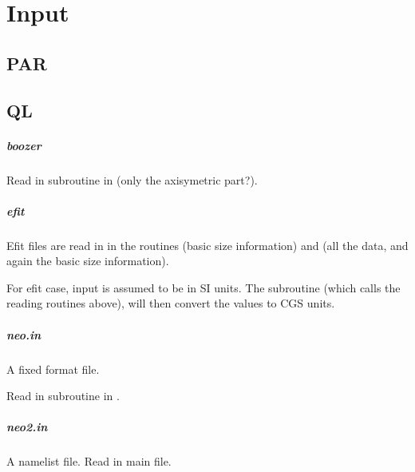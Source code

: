 \chapter{Input\label{ch:input}}


\section{PAR}


\section{QL}

\paragraph{boozer}
Read in subroutine  in  (only
the axisymetric part?).

\paragraph{efit}
Efit files are read in  in the routines
 (basic size information) and
 (all the data, and again the basic size
information).

For efit case, input is assumed to be in SI units. The subroutine
 (which calls the reading routines above), will
then convert the values to CGS units.

\paragraph{neo.in}
A fixed format file.

Read in subroutine  in
.

\paragraph{neo2.in}
A namelist file.
Read in main file.
